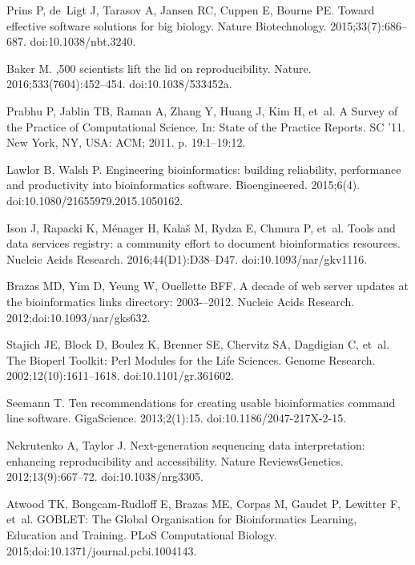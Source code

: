 \documentclass[10pt,letterpaper]{article}
\begin{document}
\begin{thebibliography}{10}

Prins P, de~Ligt J, Tarasov A, Jansen RC, Cuppen E, Bourne PE.
\newblock Toward effective software solutions for big biology.
\newblock Nature Biotechnology. 2015;33(7):686--687.
\newblock doi:{10.1038/nbt.3240}.

Baker M.
,500 scientists lift the lid on reproducibility.
\newblock Nature. 2016;533(7604):452--454.
\newblock doi:{10.1038/533452a}.

Prabhu P, Jablin TB, Raman A, Zhang Y, Huang J, Kim H, et~al.
\newblock A Survey of the Practice of Computational Science.
\newblock In: State of the Practice Reports. SC '11. New York, NY, USA: ACM;
  2011. p. 19:1--19:12.

Lawlor B, Walsh P.
\newblock Engineering bioinformatics: building reliability, performance and
  productivity into bioinformatics software.
\newblock Bioengineered. 2015;6(4).
\newblock doi:{10.1080/21655979.2015.1050162}.

Ison J, Rapacki K, Ménager H, Kalaš M, Rydza E, Chmura P, et~al.
\newblock Tools and data services registry: a community effort to document
  bioinformatics resources.
\newblock Nucleic Acids Research. 2016;44(D1):D38--D47.
\newblock doi:{10.1093/nar/gkv1116}.

Brazas MD, Yim D, Yeung W, Ouellette BFF.
\newblock A decade of web server updates at the bioinformatics links directory:
  2003-–2012.
\newblock Nucleic Acids Research. 2012;doi:{10.1093/nar/gks632}.

Stajich JE, Block D, Boulez K, Brenner SE, Chervitz SA, Dagdigian C, et~al.
\newblock The Bioperl Toolkit: Perl Modules for the Life Sciences.
\newblock Genome Research. 2002;12(10):1611--1618.
\newblock doi:{10.1101/gr.361602}.

Seemann T.
\newblock Ten recommendations for creating usable bioinformatics command line
  software.
\newblock GigaScience. 2013;2(1):15.
\newblock doi:{10.1186/2047-217X-2-15}.

Nekrutenko A, Taylor J.
\newblock Next-generation sequencing data interpretation: enhancing
  reproducibility and accessibility.
\newblock Nature ReviewsGenetics. 2012;13(9):667--72.
\newblock doi:{10.1038/nrg3305}.

Atwood TK, Bongcam-Rudloff E, Brazas ME, Corpas M, Gaudet P, Lewitter F, et~al.
\newblock GOBLET: The Global Organisation for Bioinformatics Learning,
  Education and Training.
\newblock PLoS Computational Biology. 2015;doi:{10.1371/journal.pcbi.1004143}.


\end{thebibliography}
\end{document}
